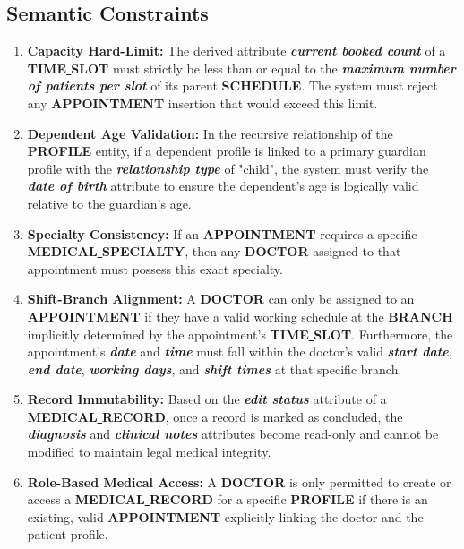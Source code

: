 \subsection{Semantic Constraints}
\begin{sloppypar}
    \begin{enumerate}
    \item \textbf{Capacity Hard-Limit:} 
    The derived attribute \textbf{\textit{current booked count}} of a \textbf{TIME\uline{ }SLOT} must strictly be less than or equal to the \textbf{\textit{maximum number of patients per slot}} of its parent \textbf{SCHEDULE}. The system must reject any \textbf{APPOINTMENT} insertion that would exceed this limit.

    \item \textbf{Dependent Age Validation:} 
    In the recursive relationship of the \textbf{PROFILE} entity, if a dependent profile is linked to a primary guardian profile with the \textbf{\textit{relationship type}} of "child", the system must verify the \textbf{\textit{date of birth}} attribute to ensure the dependent's age is logically valid relative to the guardian's age.

    \item \textbf{Specialty Consistency:} 
    If an \textbf{APPOINTMENT} requires a specific \textbf{MEDICAL\uline{ }SPECIALTY}, then any \textbf{DOCTOR} assigned to that appointment must possess this exact specialty.

    \item \textbf{Shift-Branch Alignment:} 
    A \textbf{DOCTOR} can only be assigned to an \textbf{APPOINTMENT} if they have a valid working schedule at the \textbf{BRANCH} implicitly determined by the appointment's \textbf{TIME\uline{ }SLOT}. Furthermore, the appointment's \textbf{\textit{date}} and \textbf{\textit{time}} must fall within the doctor's valid \textbf{\textit{start date}}, \textbf{\textit{end date}}, \textbf{\textit{working days}}, and \textbf{\textit{shift times}} at that specific branch.

    \item \textbf{Record Immutability:} 
    Based on the \textbf{\textit{edit status}} attribute of a \textbf{MEDICAL\uline{ }RECORD}, once a record is marked as concluded, the \textbf{\textit{diagnosis}} and \textbf{\textit{clinical notes}} attributes become read-only and cannot be modified to maintain legal medical integrity.

    \item \textbf{Role-Based Medical Access:} 
    A \textbf{DOCTOR} is only permitted to create or access a \textbf{MEDICAL\uline{ }RECORD} for a specific \textbf{PROFILE} if there is an existing, valid \textbf{APPOINTMENT} explicitly linking the doctor and the patient profile.


\end{enumerate}
\end{sloppypar}
